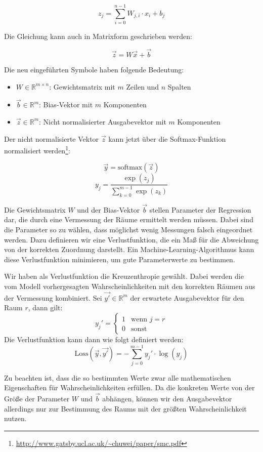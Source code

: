 $$ z_j = \sum_{i=0}^{n-1} W_{j,i} \cdot x_i + b_j $$

Die Gleichung kann auch in Matrixform geschrieben werden:

$$ \vec{z} = W \vec{x} + \vec{b} $$

Die neu eingeführten Symbole haben folgende Bedeutung:
\begin{itemize}
	\item $W \in \mathbb{R}^{m \times n}$: Gewichtsmatrix mit $m$ Zeilen und $n$ Spalten
	\item $\vec{b} \in \mathbb{R}^m$: Bias-Vektor mit $m$ Komponenten
	\item $\vec{z} \in \mathbb{R}^m$: Nicht normalisierter Ausgabevektor mit $m$ Komponenten
\end{itemize}

Der nicht normalisierte Vektor $\vec{z}$ kann jetzt über die Softmax-Funktion normalisiert
werden\footnote{\url{http://www.gatsby.ucl.ac.uk/~chuwei/paper/smc.pdf}}:

$$ \vec{y} = \text{softmax}(\vec{z}) $$
$$ y_j = \frac{\exp(z_j)}{\sum_{k=0}^{m-1} \exp(z_k) } $$

Die Gewichtsmatrix $W$ und der Bias-Vektor $\vec{b}$ stellen Parameter der Regression dar,
die durch eine Vermessung der Räume ermittelt werden müssen. Dabei sind die Parameter so
zu wählen, dass möglichst wenig Messungen falsch eingeordnet werden. Dazu definieren wir
eine Verlustfunktion, die ein Maß für die Abweichung von der korrekten Zuordnung darstellt.
Ein Machine-Learning-Algorithmus kann diese Verlustfunktion minimieren, um
gute Parameterwerte zu bestimmen.

Wir haben als Verlustfunktion die Kreuzenthropie gewählt. Dabei werden die vom Modell vorhergesagten
Wahrscheinlichkeiten mit den korrekten Räumen aus der Vermessung kombiniert.
Sei $\vec{y'} \in \mathbb{R}^m$ der erwartete Ausgabevektor für den Raum $r$, dann gilt:
\[
y_j' = 
\begin{cases}
	1 & \text{wenn } j = r  \\ 
	0 & \text{sonst}
\end{cases}
\]
Die Verlustfunktion kann dann wie folgt definiert werden:
$$ \text{Loss}(\vec{y}, \vec{y'}) = - \sum_{j=0}^{m-1} y_j' \cdot \log(y_j) $$

Zu beachten ist, dass die so bestimmten Werte zwar alle mathematischen
Eigenschaften für Wahrscheinlichkeiten erfüllen. Da die konkreten Werte von der
Größe der Parameter $W$ und $\vec{b}$ abhängen, können wir den Ausgabevektor
allerdings nur zur Bestimmung des Raums mit der größten Wahrscheinlichkeit nutzen.

